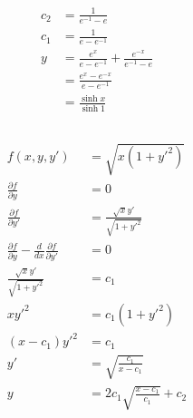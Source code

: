 \documentclass{article}
\begin{document}
\begin{align*}
  c_2                                                                          & = \frac{1}{e^{-1} - e}                               \\
  c_1                                                                          & = \frac{1}{e - e^{-1}}                               \\
  y                                                                            & = \frac{e^x}{e - e^{-1}} + \frac{e^{-x}}{e^{-1} - e} \\
                                                                               & = \frac{e^x - e^{-x}}{e - e^{-1}}                    \\
                                                                               & = \frac{\sinh x}{\sinh 1}
\end{align*}

\setcounter{subsection}{10}
\subsection{}

\begin{align*}
  f(x, y, y')                                                                  & = \sqrt{x (1 + y'^2)}                    \\
  \frac{\partial f}{\partial y}                                                & = 0                                      \\
  \frac{\partial f}{\partial y'}                                               & = \frac{\sqrt{x} y'}{\sqrt{1 + y'^2}}    \\
  \frac{\partial f}{\partial y} - \frac{d}{d x} \frac{\partial f}{\partial y'} & = 0                                      \\
  \frac{\sqrt{x} y'}{\sqrt{1 + y'^2}}                                          & = c_1                                    \\
  x y'^2                                                                       & = c_1 (1 + y'^2)                         \\
  (x - c_1) y'^2                                                               & = c_1                                    \\
  y'                                                                           & = \sqrt{\frac{c_1}{x - c_1}}             \\
  y                                                                            & = 2 c_1 \sqrt{\frac{x - c_1}{c_1}} + c_2
\end{align*}
\end{document}
